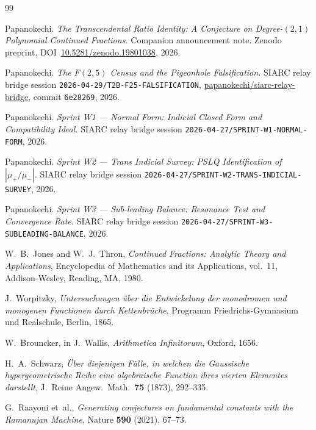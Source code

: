 \documentclass[11pt]{amsart}
\theoremstyle{definition}
\theoremstyle{remark}
\begin{document}
\begin{thebibliography}{99}

Papanokechi.
\emph{The Transcendental Ratio Identity: A Conjecture on
Degree-$(2,1)$ Polynomial Continued Fractions.}
Companion announcement note.
Zenodo preprint,
DOI~\href{https://doi.org/10.5281/zenodo.19801038}%
{10.5281/zenodo.19801038}, 2026.

Papanokechi.
\emph{The F$(2,5)$ Census and the Pigeonhole Falsification.}
SIARC relay bridge session
\texttt{2026-04-29/T2B-F25-FALSIFICATION},
\href{https://github.com/papanokechi/siarc-relay-bridge}%
{papanokechi/siarc-relay-bridge}, commit \texttt{6e28269}, 2026.

Papanokechi.
\emph{Sprint W1 --- Normal Form: Indicial Closed Form and
Compatibility Ideal.}
SIARC relay bridge session
\texttt{2026-04-27/SPRINT-W1-NORMAL-FORM}, 2026.

Papanokechi.
\emph{Sprint W2 --- Trans Indicial Survey: PSLQ Identification of
$|\mu_+/\mu_-|$.}
SIARC relay bridge session
\texttt{2026-04-27/SPRINT-W2-TRANS-INDICIAL-SURVEY}, 2026.

Papanokechi.
\emph{Sprint W3 --- Sub-leading Balance: Resonance Test and
Convergence Rate.}
SIARC relay bridge session
\texttt{2026-04-27/SPRINT-W3-SUBLEADING-BALANCE}, 2026.

W.~B.~Jones and W.~J.~Thron,
\emph{Continued Fractions: Analytic Theory and Applications},
Encyclopedia of Mathematics and its Applications, vol.~11,
Addison-Wesley, Reading, MA, 1980.

J.~Worpitzky,
\emph{Untersuchungen \"uber die Entwickelung der monodromen und
monogenen Functionen durch Kettenbr\"uche},
Programm Friedrichs-Gymnasium und Realschule, Berlin, 1865.

W.~Brouncker, in J.~Wallis,
\emph{Arithmetica Infinitorum}, Oxford, 1656.

H.~A.~Schwarz,
\emph{\"Uber diejenigen F\"alle, in welchen die Gauss\-ische
hypergeometrische Reihe eine algebraische Function ihres vierten
Elementes darstellt},
J.\ Reine Angew.\ Math.\ \textbf{75} (1873), 292--335.

G.~Raayoni et~al.,
\emph{Generating conjectures on fundamental constants with the
Ramanujan Machine},
Nature \textbf{590} (2021), 67--73.


\end{thebibliography}
\end{document}

